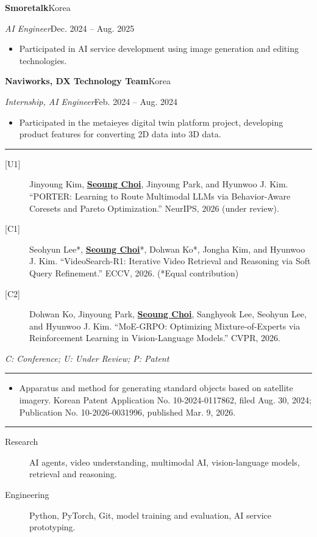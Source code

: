 \documentclass[10pt]{article}
\newcommand{\cvsection}[1]{%
  \vspace{0.55em}
  \noindent{\large\bfseries\MakeUppercase{#1}}\par
  \vspace{0.15em}
  \hrule
  \vspace{0.35em}
}
\newcommand{\cventry}[4]{%
  \noindent\textbf{#1}\hfill #2\par
  \noindent\textit{#3}\hfill #4\par
}
\begin{document}
\cventry{Smoretalk}{Korea}{AI Engineer}{Dec. 2024 -- Aug. 2025}
\begin{itemize}
  \item Participated in AI service development using image generation and editing technologies.
\end{itemize}

\cventry{Naviworks, DX Technology Team}{Korea}{Internship, AI Engineer}{Feb. 2024 -- Aug. 2024}
\begin{itemize}
  \item Participated in the metaieyes digital twin platform project, developing product features for converting 2D data into 3D data.
\end{itemize}

\cvsection{Publications}
\begin{description}
  \item[\textnormal{[U1]}] Jinyoung Kim, \textbf{\underline{Seoung Choi}}, Jinyoung Park, and Hyunwoo J. Kim. ``PORTER: Learning to Route Multimodal LLMs via Behavior-Aware Coresets and Pareto Optimization.'' NeurIPS, 2026 (under review).
  \item[\textnormal{[C1]}] Seohyun Lee*, \textbf{\underline{Seoung Choi}}*, Dohwan Ko*, Jongha Kim, and Hyunwoo J. Kim. ``VideoSearch-R1: Iterative Video Retrieval and Reasoning via Soft Query Refinement.'' ECCV, 2026. (*Equal contribution)
  \item[\textnormal{[C2]}] Dohwan Ko, Jinyoung Park, \textbf{\underline{Seoung Choi}}, Sanghyeok Lee, Seohyun Lee, and Hyunwoo J. Kim. ``MoE-GRPO: Optimizing Mixture-of-Experts via Reinforcement Learning in Vision-Language Models.'' CVPR, 2026.
\end{description}
\noindent\small\textit{C: Conference; U: Under Review; P: Patent}\normalsize

\cvsection{Patent}
\begin{itemize}
  \item[\textnormal{[P1]}] Apparatus and method for generating standard objects based on satellite imagery. Korean Patent Application No. 10-2024-0117862, filed Aug. 30, 2024; Publication No. 10-2026-0031996, published Mar. 9, 2026.
\end{itemize}

\cvsection{Skills}
\begin{description}
  \item[Research] AI agents, video understanding, multimodal AI, vision-language models, retrieval and reasoning.
  \item[Engineering] Python, PyTorch, Git, model training and evaluation, AI service prototyping.
\end{description}
\end{document}
